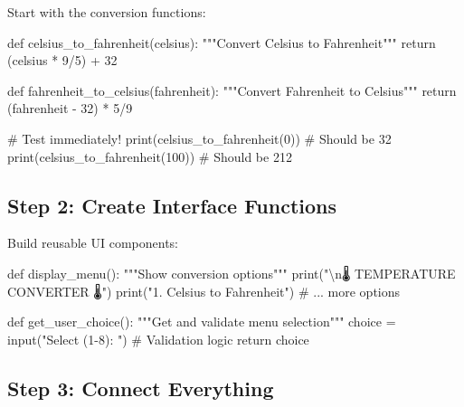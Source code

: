 \documentclass[
  letterpaper,
  DIV=11,
  numbers=noendperiod,
  oneside]{scrreprt}
\newenvironment{Shaded}{}{}
\newcommand{\BuiltInTok}[1]{\textcolor[rgb]{0.84,0.23,0.29}{#1}}
\newcommand{\CharTok}[1]{\textcolor[rgb]{0.01,0.18,0.38}{#1}}
\newcommand{\CommentTok}[1]{\textcolor[rgb]{0.42,0.45,0.49}{#1}}
\newcommand{\ControlFlowTok}[1]{\textcolor[rgb]{0.84,0.23,0.29}{#1}}
\newcommand{\DecValTok}[1]{\textcolor[rgb]{0.00,0.36,0.77}{#1}}
\newcommand{\KeywordTok}[1]{\textcolor[rgb]{0.84,0.23,0.29}{#1}}
\newcommand{\NormalTok}[1]{\textcolor[rgb]{0.14,0.16,0.18}{#1}}
\newcommand{\OperatorTok}[1]{\textcolor[rgb]{0.14,0.16,0.18}{#1}}
\newcommand{\StringTok}[1]{\textcolor[rgb]{0.01,0.18,0.38}{#1}}
\begin{document}
Start with the conversion functions:

\begin{Shaded}
\begin{Highlighting}[]
\KeywordTok{def}\NormalTok{ celsius\_to\_fahrenheit(celsius):}
    \CommentTok{"""Convert Celsius to Fahrenheit"""}
    \ControlFlowTok{return}\NormalTok{ (celsius }\OperatorTok{*} \DecValTok{9}\OperatorTok{/}\DecValTok{5}\NormalTok{) }\OperatorTok{+} \DecValTok{32}

\KeywordTok{def}\NormalTok{ fahrenheit\_to\_celsius(fahrenheit):}
    \CommentTok{"""Convert Fahrenheit to Celsius"""}
    \ControlFlowTok{return}\NormalTok{ (fahrenheit }\OperatorTok{{-}} \DecValTok{32}\NormalTok{) }\OperatorTok{*} \DecValTok{5}\OperatorTok{/}\DecValTok{9}

\CommentTok{\# Test immediately!}
\BuiltInTok{print}\NormalTok{(celsius\_to\_fahrenheit(}\DecValTok{0}\NormalTok{))    }\CommentTok{\# Should be 32}
\BuiltInTok{print}\NormalTok{(celsius\_to\_fahrenheit(}\DecValTok{100}\NormalTok{))  }\CommentTok{\# Should be 212}
\end{Highlighting}
\end{Shaded}

\subsection{Step 2: Create Interface
Functions}\label{step-2-create-interface-functions}

Build reusable UI components:

\begin{Shaded}
\begin{Highlighting}[]
\KeywordTok{def}\NormalTok{ display\_menu():}
    \CommentTok{"""Show conversion options"""}
    \BuiltInTok{print}\NormalTok{(}\StringTok{"}\CharTok{\textbackslash{}n}\StringTok{🌡️  TEMPERATURE CONVERTER  🌡️"}\NormalTok{)}
    \BuiltInTok{print}\NormalTok{(}\StringTok{"1. Celsius to Fahrenheit"}\NormalTok{)}
    \CommentTok{\# ... more options}
    
\KeywordTok{def}\NormalTok{ get\_user\_choice():}
    \CommentTok{"""Get and validate menu selection"""}
\NormalTok{    choice }\OperatorTok{=} \BuiltInTok{input}\NormalTok{(}\StringTok{"Select (1{-}8): "}\NormalTok{)}
    \CommentTok{\# Validation logic}
    \ControlFlowTok{return}\NormalTok{ choice}
\end{Highlighting}
\end{Shaded}

\subsection{Step 3: Connect Everything}\label{step-3-connect-everything}
\end{document}
